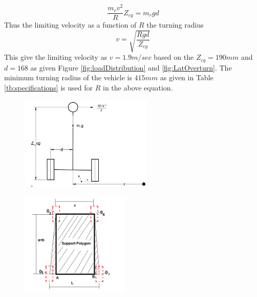 \begin{equation}
\label{eqn:LatOverturn}
\frac{m_r v^2}{R}Z_{cg}=m_r g d 
\end{equation}
Thus the limiting velocity as a function of $R$ the turning radius
\begin{equation}
\label{eqn:Vel_limit}
v=\sqrt{\frac{R g d}{Z_{cg}}}
\end{equation}
This give the limiting velocity as $v=1.9m/sec$ based on the $Z_{cg}=190mm$ and $d=168$ as given Figure \ref{fig:loadDistribution} and \ref{fig:LatOverturn}. The minimum turning radius of the vehicle is $415mm$ as given in Table \ref{tb:specifications} is used for $R$ in the above equation.

\begin{figure}
 	\centering
 	\begin{minipage}{.5\textwidth}
 		\centering
 		\includegraphics[width=.9\linewidth,height=4.5cm,keepaspectratio]{Chapter3/fig/LateralOverturn}
 		\label{fig:LatOverturn}
 	\end{minipage}%
 	\begin{minipage}{.5\textwidth}
 		\centering
 		\includegraphics[height=5cm,keepaspectratio]{Chapter3/fig/Supportpolygon.png}
 		\label{fig:supportPoly}
 	\end{minipage}
 \end{figure}

